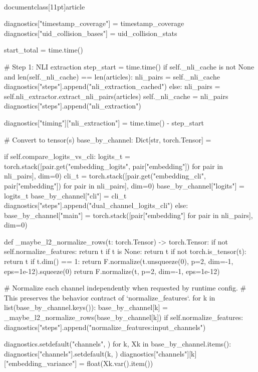 \\documentclass[11pt]{article}
\begin{document}
\begin{CodeBlock}
        diagnostics["timestamp_coverage"] = timestamp_coverage
        diagnostics["uid_collision_bases"] = uid_collision_stats

        start_total = time.time()

        # Step 1: NLI extraction
        step_start = time.time()
        if self._nli_cache is not None and len(self._nli_cache) == len(articles):
            nli_pairs = self._nli_cache
            diagnostics["steps"].append("nli_extraction_cached")
        else:
            nli_pairs = self.nli_extractor.extract_nli_pairs(articles)
            self._nli_cache = nli_pairs
            diagnostics["steps"].append("nli_extraction")

        diagnostics["timing"]["nli_extraction"] = time.time() - step_start

        # Convert to tensor(s)
        base_by_channel: Dict[str, torch.Tensor] = {}

        if self.compare_logits_vs_cli:
            logits_t = torch.stack([pair.get("embedding_logits", pair["embedding"]) for pair in nli_pairs], dim=0)
            cli_t = torch.stack([pair.get("embedding_cli", pair["embedding"]) for pair in nli_pairs], dim=0)
            base_by_channel["logits"] = logits_t
            base_by_channel["cli"] = cli_t
            diagnostics["steps"].append("dual_channel_logits_cli")
        else:
            base_by_channel["main"] = torch.stack([pair["embedding"] for pair in nli_pairs], dim=0)

        def _maybe_l2_normalize_rows(t: torch.Tensor) -> torch.Tensor:
            if not self.normalize_features:
                return t
            if t is None:
                return t
            if not torch.is_tensor(t):
                return t
            if t.dim() == 1:
                return F.normalize(t.unsqueeze(0), p=2, dim=-1, eps=1e-12).squeeze(0)
            return F.normalize(t, p=2, dim=-1, eps=1e-12)

        # Normalize each channel independently when requested by runtime config.
        # This preserves the behavior contract of `normalize_features`.
        for k in list(base_by_channel.keys()):
            base_by_channel[k] = _maybe_l2_normalize_rows(base_by_channel[k])
        if self.normalize_features:
            diagnostics["steps"].append("normalize_features:input_channels")

        diagnostics.setdefault("channels", {})
        for k, Xk in base_by_channel.items():
            diagnostics["channels"].setdefault(k, {})
            diagnostics["channels"][k]["embedding_variance"] = float(Xk.var().item())


\end{CodeBlock}
\end{document}

